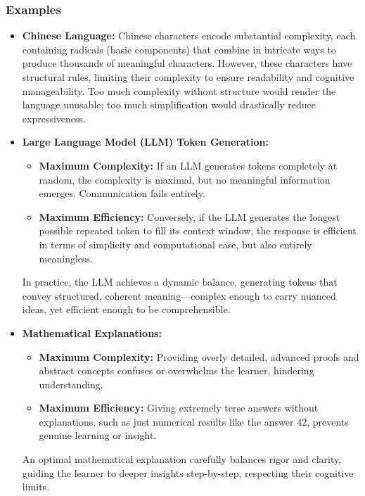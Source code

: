 \documentclass[12pt]{article}
\begin{document}
\subsubsection{Examples}
\begin{itemize}
    \item \textbf{Chinese Language:}  
    Chinese characters encode substantial complexity, each containing radicals (basic components) that combine in intricate ways to produce thousands of meaningful characters. However, these characters have structural rules, limiting their complexity to ensure readability and cognitive manageability. Too much complexity without structure would render the language unusable; too much simplification would drastically reduce expressiveness.
    
    \item \textbf{Large Language Model (LLM) Token Generation:}  
    \begin{itemize}
        \item \textbf{Maximum Complexity:}  
        If an LLM generates tokens completely at random, the complexity is maximal, but no meaningful information emerges. Communication fails entirely.
        \item \textbf{Maximum Efficiency:}  
        Conversely, if the LLM generates the longest possible repeated token to fill its context window, the response is efficient in terms of simplicity and computational ease, but also entirely meaningless.
    \end{itemize}
    In practice, the LLM achieves a dynamic balance, generating tokens that convey structured, coherent meaning—complex enough to carry nuanced ideas, yet efficient enough to be comprehensible.

    \item \textbf{Mathematical Explanations:}  
    \begin{itemize}
        \item \textbf{Maximum Complexity:}  
        Providing overly detailed, advanced proofs and abstract concepts confuses or overwhelms the learner, hindering understanding.
        \item \textbf{Maximum Efficiency:}  
        Giving extremely terse answers without explanations, such as just numerical results like the answer $42$, prevents genuine learning or insight.
    \end{itemize}
    An optimal mathematical explanation carefully balances rigor and clarity, guiding the learner to deeper insights step-by-step, respecting their cognitive limits.
\end{itemize}
\end{document}

